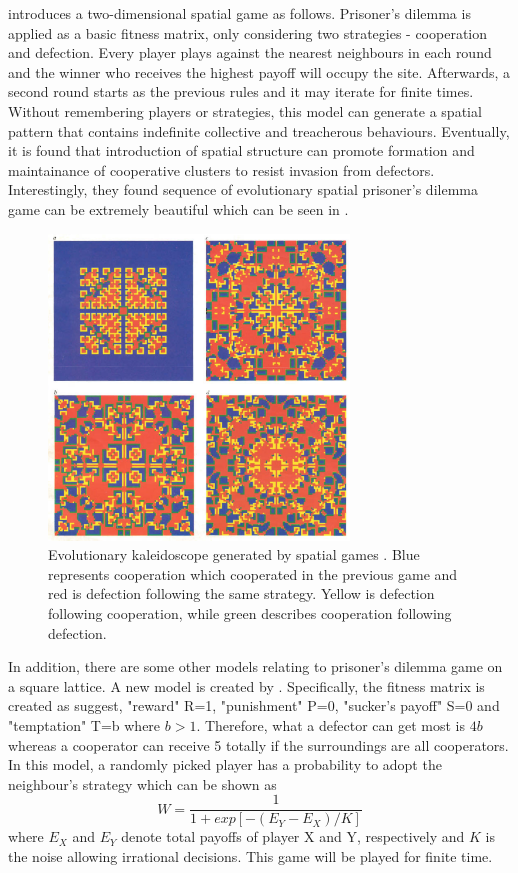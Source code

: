  \citet{nowak1992evolutionary} introduces a two-dimensional spatial game as follows. Prisoner's dilemma is applied as a basic fitness matrix, only considering two strategies - cooperation and defection. Every player plays against the nearest neighbours in each round and the winner who receives the highest payoff will occupy the site. Afterwards, a second round starts as the previous rules and it may iterate for finite times. Without remembering players or strategies, this model can generate a spatial pattern that contains indefinite collective and treacherous behaviours. Eventually, it is found that introduction of spatial structure can promote formation and maintainance of cooperative clusters to resist invasion from defectors. Interestingly, they found sequence of evolutionary spatial prisoner's dilemma game can be extremely beautiful which can be seen in .
 \begin{figure}[!htb]
  \centering
  \includegraphics[width=8cm]{wanhuatong.png}
  \caption[Evolutionary kaleidoscope generated by spatial games]{Evolutionary kaleidoscope generated by spatial games \citep{nowak1992evolutionary}. Blue represents cooperation which cooperated in the previous game and red is defection following the same strategy. Yellow is defection following cooperation, while green describes cooperation following defection.}
  \label{Figure:wanhuatong}
\end{figure}

In addition, there are some other models relating to prisoner's dilemma game on a square lattice. A new model is created by \citet{szabo1998evolutionary}. Specifically, the fitness matrix is created as  \citet{nowak1993spatial} suggest, "reward" R=1, "punishment" P=0, "sucker's payoff" S=0 and "temptation" T=b where $b>1$. Therefore, what a defector can get most is $4b$ whereas a cooperator can receive 5 totally if the surroundings are all cooperators. In this model, a randomly picked player has a probability to adopt the neighbour's strategy which can be shown as 
\begin{equation}\label{eq:2.6}
   W=\frac{1}{1+exp[-(E_Y-E_X)/K]}
\end{equation}
where $E_X$ and $E_Y$ denote total payoffs of player X and Y, respectively and $K$ is the noise allowing irrational decisions. This game will be played for finite time.

